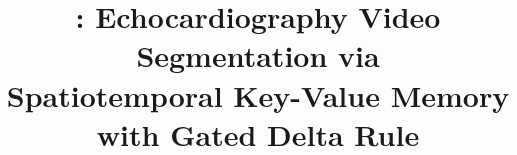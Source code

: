 \documentclass[10pt,twocolumn,letterpaper]{article}
\title{\mymodel: Echocardiography Video Segmentation via \\ Spatiotemporal Key-Value Memory with Gated Delta Rule}
\begin{document}
\maketitle
    


            
    
    

    
    
            
    
            
    
            

    
    
            
        
            
            
            
        
            
            
    
        
            
        
             

            



{
    \small
    
    
}


\end{document}
